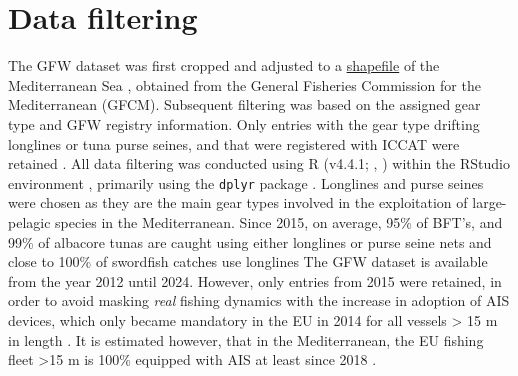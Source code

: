 \section{Data filtering}
The GFW dataset was first cropped and adjusted to a
\href{https://www.fao.org/gfcm/data/maps/gsas/es/}{shapefile} of the Mediterranean Sea
, obtained from the General Fisheries Commission for the Mediterranean
(GFCM). Subsequent filtering was based on the assigned gear type and GFW registry information. Only
entries with the gear type drifting longlines or tuna purse seines, and that were registered with
ICCAT were retained . All data filtering was conducted using R (v4.4.1;
\citeauthor{r_language}, \citeyear{r_language}) within the RStudio environment \citep{rstudio},
primarily using the \texttt{dplyr} package \citep{dplyr}. Longlines and purse seines were chosen as
they are the main gear types involved in the exploitation of large-pelagic species in the
Mediterranean. Since 2015, on average, 95\% of BFT's, and 99\% of albacore tunas are caught using
either longlines or purse seine nets and close to 100\% of swordfish catches use longlines
\citep{iccat_bft_summary,iccat_alb_summary,iccat_swo_summary} The GFW dataset is available from the
year 2012 until 2024. However, only entries from 2015 were retained, in order to avoid masking
\textit{real} fishing dynamics with the increase in adoption of AIS devices, which only became
mandatory in the EU in 2014 for all vessels > 15 m in length \citep{ec2011directive}. It is
estimated however, that in the Mediterranean, the EU fishing fleet >15 m is 100\% equipped with AIS
at least since 2018 \citep{taconet2019global}.

